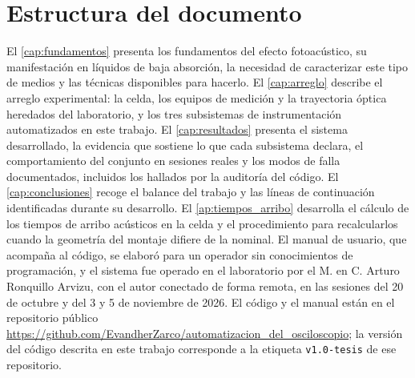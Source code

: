 \section{Estructura del documento}
\label{sec:estructura}

El \cref{cap:fundamentos} presenta los fundamentos del efecto
fotoacústico, su manifestación en líquidos de baja absorción, la
necesidad de caracterizar este tipo de medios y las técnicas
disponibles para hacerlo. El \cref{cap:arreglo} describe el arreglo
experimental: la celda, los equipos de medición y la trayectoria óptica
heredados del laboratorio, y los tres subsistemas de instrumentación
automatizados en este trabajo. El \cref{cap:resultados} presenta el
sistema desarrollado, la evidencia que sostiene lo que cada subsistema
declara, el comportamiento del conjunto en sesiones reales y los modos
de falla documentados, incluidos los hallados por la auditoría del
código. El \cref{cap:conclusiones} recoge el balance del trabajo y las líneas de continuación identificadas durante su
desarrollo. El \cref{ap:tiempos_arribo} desarrolla el cálculo de los
tiempos de arribo acústicos en la celda y el procedimiento para
recalcularlos cuando la geometría del montaje difiere de la nominal. El
manual de usuario, que acompaña al código, se elaboró para un operador sin
conocimientos de programación, y el sistema fue operado en el laboratorio por el
M. en C. Arturo Ronquillo Arvizu, con el autor conectado de forma remota, en las
sesiones del 20 de octubre y del 3 y 5 de noviembre de 2026. El código y el manual
están en el repositorio público
\url{https://github.com/EvandherZarco/automatizacion_del_osciloscopio};
la versión del código descrita en este trabajo corresponde a la etiqueta
\texttt{v1.0-tesis} de ese repositorio.
